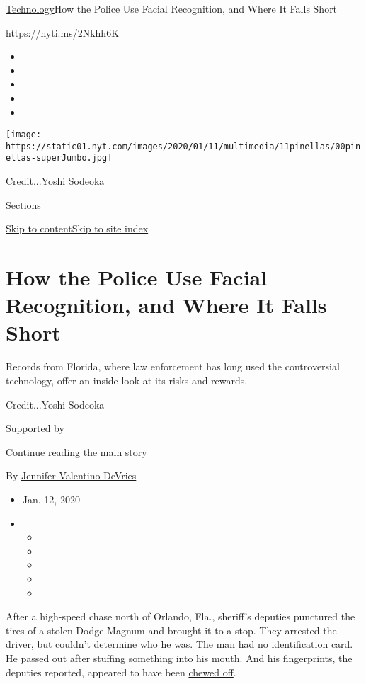 \href{/section/technology}{Technology}\textbar{}How the Police Use
Facial Recognition, and Where It Falls Short

\url{https://nyti.ms/2Nkhh6K}

\begin{itemize}
\item
\item
\item
\item
\item
\end{itemize}

\texttt{[image: https://static01.nyt.com/images/2020/01/11/multimedia/11pinellas/00pinellas-superJumbo.jpg]}

Credit...Yoshi Sodeoka

Sections

\protect\hyperlink{site-content}{Skip to
content}\protect\hyperlink{site-index}{Skip to site index}

\hypertarget{how-the-police-use-facial-recognition-and-where-it-falls-short}{%
\section{How the Police Use Facial Recognition, and Where It Falls
Short}\label{how-the-police-use-facial-recognition-and-where-it-falls-short}}

Records from Florida, where law enforcement has long used the
controversial technology, offer an inside look at its risks and rewards.

Credit...Yoshi Sodeoka

Supported by

\protect\hyperlink{after-sponsor}{Continue reading the main story}

By \href{https://www.nytimes.com/by/jennifer-valentino-devries}{Jennifer
Valentino-DeVries}

\begin{itemize}
\item
  Jan. 12, 2020
\item
  \begin{itemize}
  \item
  \item
  \item
  \item
  \item
  \end{itemize}
\end{itemize}

After a high-speed chase north of Orlando, Fla., sheriff's deputies
punctured the tires of a stolen Dodge Magnum and brought it to a stop.
They arrested the driver, but couldn't determine who he was. The man had
no identification card. He passed out after stuffing something into his
mouth. And his fingerprints, the deputies reported, appeared to have
been
\href{https://www.documentcloud.org/documents/6581927-Seminolecountycarchase-Redacted.html}{chewed
off}.


